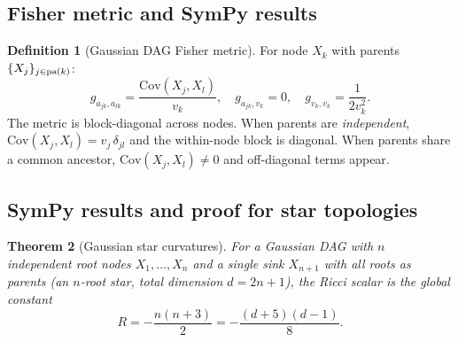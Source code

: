 \documentclass[11pt]{article}
\newtheorem{theorem}{Theorem}[section]
\theoremstyle{definition}
\newtheorem{definition}[theorem]{Definition}
\begin{document}
\subsection{Fisher metric and SymPy results}

\begin{definition}[Gaussian DAG Fisher metric]
For node $X_k$ with parents $\{X_j\}_{j \in {\rm pa}(k)}$:
\begin{equation}\label{eq:gauss_FIM}
  g_{a_{jk}, a_{lk}} = \frac{\mathrm{Cov}(X_j, X_l)}{v_k}, \quad
  g_{a_{jk}, v_k} = 0, \quad
  g_{v_k, v_k} = \frac{1}{2v_k^2}.
\end{equation}
The metric is block-diagonal across nodes.  When parents are 
\emph{independent}, $\mathrm{Cov}(X_j,X_l)=v_j\,\delta_{jl}$ and the 
within-node block is diagonal.  When parents share a common ancestor, 
$\mathrm{Cov}(X_j,X_l) \neq 0$ and off-diagonal terms appear.
\end{definition}

\subsection{SymPy results and proof for star topologies}

\begin{theorem}[Gaussian star curvatures]\label{thm:gauss_R}
For a Gaussian DAG with $n$ independent root nodes $X_1,\ldots,X_n$ and 
a single sink $X_{n+1}$ with all roots as parents 
(an $n$-root star, total dimension $d = 2n+1$), the Ricci scalar is 
the global constant
\begin{equation}\label{eq:gauss_R_formula}
  R = -\frac{n(n+3)}{2} = -\frac{(d+5)(d-1)}{8}.
\end{equation}
\end{theorem}
\end{document}
